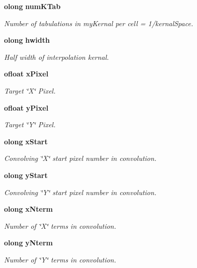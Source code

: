 \begin{CompactItemize}
{\bf olong} {\bf num\-KTab}
\begin{CompactList}\small\item\em Number of tabulations in my\-Kernal per cell = 1/kernal\-Space. \item\end{CompactList}\item 
{\bf olong} {\bf hwidth}
\begin{CompactList}\small\item\em Half width of interpolation kernal. \item\end{CompactList}\item 
{\bf ofloat} {\bf x\-Pixel}
\begin{CompactList}\small\item\em Target \char`\"{}X\char`\"{} Pixel. \item\end{CompactList}\item 
{\bf ofloat} {\bf y\-Pixel}
\begin{CompactList}\small\item\em Target \char`\"{}Y\char`\"{} Pixel. \item\end{CompactList}\item 
{\bf olong} {\bf x\-Start}
\begin{CompactList}\small\item\em Convolving \char`\"{}X\char`\"{} start pixel number in convolution. \item\end{CompactList}\item 
{\bf olong} {\bf y\-Start}
\begin{CompactList}\small\item\em Convolving \char`\"{}Y\char`\"{} start pixel number in convolution. \item\end{CompactList}\item 
{\bf olong} {\bf x\-Nterm}
\begin{CompactList}\small\item\em Number of \char`\"{}X\char`\"{} terms in convolution. \item\end{CompactList}\item 
{\bf olong} {\bf y\-Nterm}
\begin{CompactList}\small\item\em Number of \char`\"{}Y\char`\"{} terms in convolution. \item\end{CompactList}\item 

\end{CompactItemize}
